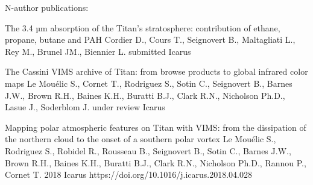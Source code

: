 \begin{cvpublications}{N-author publications:}

	{The 3.4 µm absorption of the Titan's stratosphere: contribution of ethane, propane, butane and PAH }
	{Cordier D., Cours T., Seignovert B., Maltagliati L., Rey M., Brunel JM., Biennier L.}
	{submitted}
	{Icarus}{}

    {The Cassini VIMS archive of Titan: from browse products to global infrared color maps}
	{Le Mouélic S., Cornet T., Rodriguez S., Sotin C., Seignovert B., Barnes J.W., Brown R.H., Baines K.H., Buratti B.J., Clark R.N., Nicholson Ph.D., Lasue J., Soderblom J.}
	{under review}
    {Icarus}
    {}

    {Mapping polar atmospheric features on Titan with VIMS: from the dissipation of the northern cloud to the onset of a southern polar vortex}
	{Le Mouélic S., Rodriguez S., Robidel R., Rousseau B., Seignovert B., Sotin C., Barnes J.W., Brown R.H., Baines K.H., Buratti B.J., Clark R.N., Nicholson Ph.D., Rannou P., Cornet T.}
	{2018}
    {Icarus}
    {https://doi.org/10.1016/j.icarus.2018.04.028}


\end{cvpublications}
